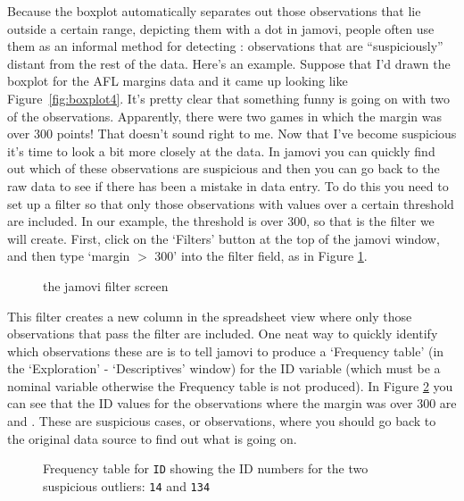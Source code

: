 Because the boxplot automatically separates out those observations that lie outside a certain range, depicting them with a dot in jamovi, people often use them as an informal method for detecting : observations that are ``suspiciously'' distant from the rest of the data. Here's an example. Suppose that I'd drawn the boxplot for the AFL margins data and it came up looking like Figure~\ref{fig:boxplot4}. It's pretty clear that something funny is going on with two of the observations. Apparently, there were two games in which the margin was over 300 points! That doesn't sound right to me. Now that I've become suspicious it's time to look a bit more closely at the data. In jamovi you can quickly find out which of these observations are suspicious and then you can go back to the raw data to see if there has been a mistake in data entry. To do this you need to set up a filter so that only those observations with values over a certain threshold are included. In our example, the threshold is over 300, so that is the filter we will create. First, click on the `Filters' button at the top of the jamovi window, and then type `margin $>$ 300' into the filter field, as in Figure \ref{fig:filter1}. 

\begin{figure}[htp]
\begin{center}
\caption{the jamovi filter screen}
\label{fig:filter1}
\HR
\end{center}
\end{figure}

This filter creates a new column in the spreadsheet view where only those observations that pass the filter are included. One neat way to quickly identify which observations these are is to tell jamovi to produce a `Frequency table' (in the `Exploration' - `Descriptives' window) for the ID variable (which must be a nominal variable otherwise the Frequency table is not produced). In Figure \ref{fig:filter2} you can see that the ID values for the observations where the margin was over 300 are  and . These are suspicious cases, or observations, where you should go back to the original data source to find out what is going on.

\begin{figure}[htp]
\begin{center}
\caption{Frequency table for \texttt{ID} showing the ID numbers for the two suspicious outliers: \texttt{14} and \texttt{134}}
\label{fig:filter2}
\HR
\end{center}
\end{figure}

